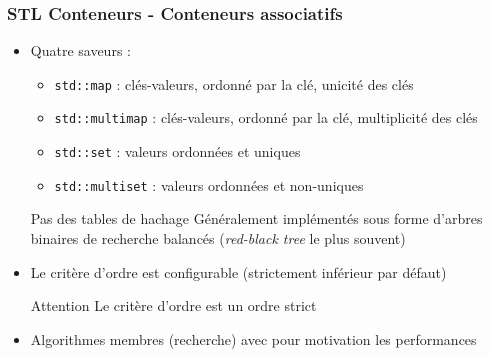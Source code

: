 \documentclass[C++.tex]{subfiles}
\begin{document}
\begin{frame}
	\frametitle{STL Conteneurs - Conteneurs associatifs}
	\begin{itemize}
		\item Quatre saveurs :
		\begin{itemize}
			\item \lstinline|std::map| : clés-valeurs, ordonné par la clé, unicité des clés
			\item \lstinline|std::multimap| : clés-valeurs, ordonné par la clé, multiplicité des clés
			\item \lstinline|std::set| : valeurs ordonnées et uniques
			\item \lstinline|std::multiset| : valeurs ordonnées et non-uniques
		\end{itemize}

		\begin{alertblock}{Pas des tables de hachage}
			Généralement implémentés sous forme d'arbres binaires de recherche balancés (\textit{red-black tree} le plus souvent)
		\end{alertblock}

		\item Le critère d'ordre est configurable (strictement inférieur par défaut)

		\begin{alertblock}{Attention}
			Le critère d'ordre est un ordre strict
		\end{alertblock}

		\item Algorithmes membres (recherche) avec pour motivation les performances
	\end{itemize}
\end{frame}
\end{document}
